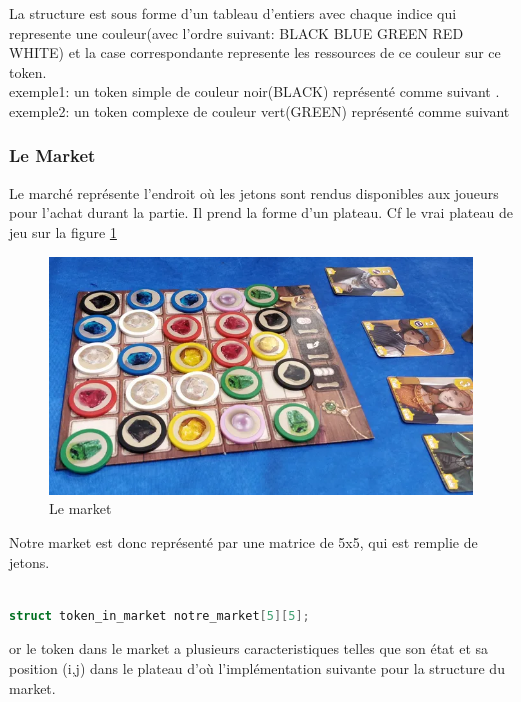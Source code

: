 \documentclass{article}
\begin{document}
La structure est sous forme d'un tableau d'entiers avec chaque indice qui represente une couleur(avec l'ordre suivant: BLACK BLUE GREEN RED WHITE) et la case correspondante represente les ressources de ce couleur sur ce token.\\ 

\vspace{1em}exemple1: un token simple de couleur noir(BLACK) représenté comme suivant .\\
 
\vspace{1em}
exemple2: un token complexe de couleur vert(GREEN) représenté comme suivant 

\subsubsection{Le Market}
 Le marché représente l'endroit où les jetons sont rendus disponibles aux joueurs pour l'achat durant la partie. Il prend la forme d'un plateau. Cf le vrai plateau de jeu sur la figure \ref{fig:PLATEAU}
\begin{figure}[ht]
    \centering
    \includegraphics[width=0.4\linewidth]{plateau.png}
    \caption{Le market}
    \label{fig:PLATEAU}
\end{figure}

Notre market est donc  représenté par une matrice de 5x5, qui est remplie de jetons.
\begin{tcolorbox}[colback=white!5,colframe=white!75!black]

\begin{lstlisting}[language=C, caption={le plateau}, label={lst:exemple6-c}]

struct token_in_market notre_market[5][5];
\end{lstlisting}
\end{tcolorbox}
or le token dans le market a plusieurs caracteristiques telles que son état et sa position (i,j) dans le plateau d'où l'implémentation suivante pour la structure du market.
\end{document}
